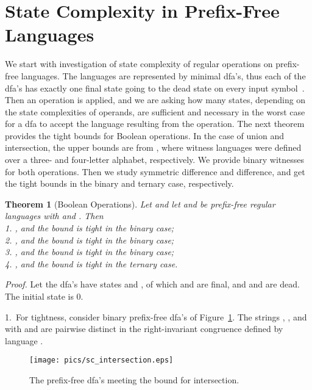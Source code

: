 \documentclass[copyright]{eptcs}
\newtheorem{theorem}{Theorem}
\begin{document}
 \section{State Complexity in Prefix-Free Languages}
 \label{***state}

 We start with investigation of
 state complexity of regular operations on prefix-free languages.
 The languages are represented by minimal dfa's,
 thus each of the dfa's has
 exactly one final state going to the dead state
 on every input symbol~\cite{hs09}.
 Then an operation is applied, and we are asking how many states,
 depending on the state complexities of operands,
 are sufficient and necessary in the worst case for a dfa
 to accept the language resulting from the operation.
 The next theorem provides the tight bounds for Boolean operations.
 In the case of union and intersection, the upper bounds are from \cite{hs09},
 where witness languages were defined 
 over a three- and four-letter alphabet, respectively.
 We provide binary witnesses for both operations.
 Then we study symmetric difference and difference,
 and get the tight bounds in the binary and ternary case, respectively.

 \begin{theorem}[Boolean Operations]\label{thm:sc_boolean}
  Let  and let   and 
  be  prefix-free regular languages  with  and .
  Then \\
  1. , and the bound is tight in the binary case; \\
  2. , and the bound is tight in the binary case;\\
  3. , and the bound is tight in the binary case;\\
  4. , and the bound is tight in the ternary case.
 \end{theorem}

 \noindent\emph{Proof.}
  Let the dfa's have states  and ,
  of which  and  are final, and  and  are dead. 
  The initial state is 0.
  
  1.~For tightness, consider binary prefix-free 
  dfa's of Figure~\ref{fig:sc_intersection}.
  The strings
  , , and  with  
  and  are pairwise distinct
  in the right-invariant congruence defined by language .

  \begin{figure}[t]
  \centerline{\texttt{[image: pics/sc\_intersection.eps]}}
  \caption{The prefix-free  dfa's
           meeting the  bound  for intersection.}
  \label{fig:sc_intersection}
  \end{figure}
\end{document}
